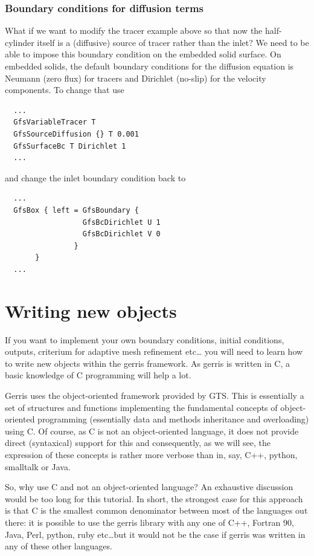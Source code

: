 \documentclass[a4paper]{article}
\begin{document}
\subsubsection{\label{diffusionbc}Boundary conditions for diffusion terms}

What if we want to modify the tracer example above so that now the
half-cylinder itself is a (diffusive) source of tracer rather than the
inlet? We need to be able to impose this boundary condition on the
embedded solid surface. On embedded solids, the default boundary
conditions for the diffusion equation is Neumann (zero flux) for
tracers and Dirichlet (no-slip) for the velocity components. To change
that use
\begin{verbatim}
  ...
  GfsVariableTracer T
  GfsSourceDiffusion {} T 0.001
  GfsSurfaceBc T Dirichlet 1
  ...
\end{verbatim}
and change the inlet boundary condition back to
\begin{verbatim}
  ...
  GfsBox { left = GfsBoundary {
                  GfsBcDirichlet U 1
                  GfsBcDirichlet V 0
                } 
       }
  ...
\end{verbatim}

\section{Writing new objects}

If you want to implement your own boundary conditions, initial
conditions, outputs, criterium for adaptive mesh refinement etc\dots
you will need to learn how to write new objects within the gerris
framework. As gerris is written in C, a basic knowledge of C
programming will help a lot.

Gerris uses the object-oriented framework provided by {\sc GTS}. This is
essentially a set of structures and functions implementing the
fundamental concepts of object-oriented programming (essentially data
and methods inheritance and overloading) using C. Of course, as C is
not an object-oriented language, it does not provide direct
(syntaxical) support for this and consequently, as we will see, the
expression of these concepts is rather more verbose than in, say, C++,
python, smalltalk or Java.

So, why use C and not an object-oriented language? An exhaustive
discussion would be too long for this tutorial. In short, the
strongest case for this approach is that C is the smallest common
denominator between most of the languages out there: it is possible to
use the gerris library with any one of C++, Fortran 90, Java, Perl,
python, ruby etc\dots but it would not be the case if gerris was written
in any of these other languages.
\end{document}
